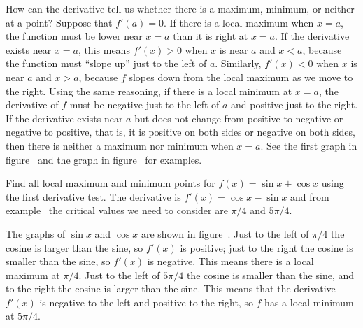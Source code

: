 How can the derivative tell us whether there is a maximum, minimum, or
neither at a point? Suppose that $f'(a)=0$. If there is a local
maximum when $x=a$, the function must be lower near $x=a$ than it is
right at $x=a$. If the derivative exists near $x=a$, this means
$f'(x)>0$ when $x$ is near $a$ and $x<a$, because the function must
``slope up'' just to the left of $a$. Similarly, $f'(x)<0$ when $x$ is
near $a$ and $x>a$, because $f$ slopes down from the local maximum as
we move to the right. Using the same reasoning, if there is a local
minimum at $x=a$, the derivative of $f$ must be negative just to the
left of $a$ and positive just to the right. If the derivative exists
near $a$ but does not change from positive to negative or negative to
positive, that is, it is positive on both sides or negative on both
sides, then there is neither a maximum nor minimum when $x=a$.
See the first graph in figure~
and the graph in figure~
for examples.

\begin{example} Find all local maximum and minimum points for $f(x)=\sin x+\cos
x$ using the first derivative test.  The derivative is $f'(x)=\cos
x-\sin x$ and from example~ the critical
values we need to consider are $\pi/4$ and $5\pi/4$.

The graphs of $\sin x$ and $\cos x$ are shown in figure~. Just to the left of $\pi/4$ the cosine is larger than the
  sine, so $f'(x)$ is positive; just to the right the cosine is
  smaller than the sine, so $f'(x)$ is negative. This means there is a
  local maximum at $\pi/4$. Just to the left of $5\pi/4$ the cosine is
  smaller than the sine, and to the right the cosine is larger than
  the sine. This means that the derivative $f'(x)$ is negative to the
  left and positive to the right, so $f$ has a local minimum at
  $5\pi/4$.
\end{example}

